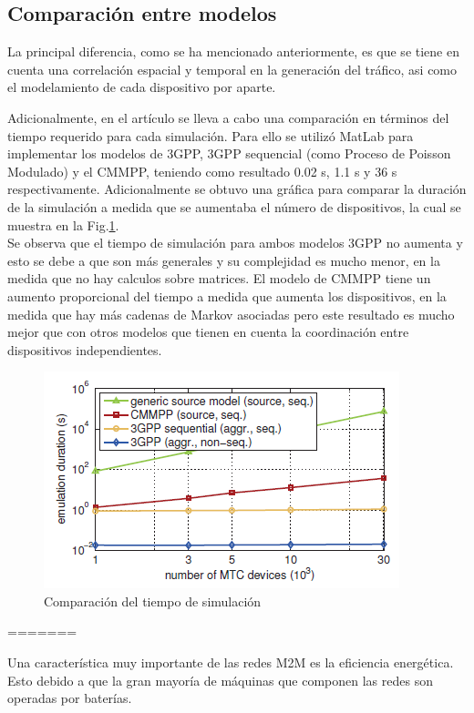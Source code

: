 \documentclass[journal]{IEEEtran}
\begin{document}
\subsection{Comparaci\'on entre modelos}
La principal diferencia, como se ha mencionado anteriormente, es que se tiene en cuenta una correlaci\'on espacial y temporal en la generaci\'on del tr\'afico, asi como el modelamiento de cada dispositivo por aparte.

Adicionalmente, en el art\'iculo se lleva a cabo una comparaci\'on en t\'erminos del tiempo requerido para cada simulaci\'on. Para ello se utiliz\'o MatLab para implementar los modelos de 3GPP, 3GPP sequencial (como Proceso de Poisson Modulado) y el CMMPP, teniendo como resultado 0.02 s, 1.1 s y 36 s respectivamente. Adicionalmente se obtuvo una gr\'afica para comparar la duraci\'on de la simulaci\'on a medida que se aumentaba el n\'umero de dispositivos, la cual se muestra en la Fig.\ref{comp}.\\

Se observa que el tiempo de simulaci\'on para ambos modelos 3GPP no aumenta y esto se debe a que son m\'as generales y su complejidad es mucho menor, en la medida que no hay calculos sobre matrices. El modelo de CMMPP tiene un aumento proporcional del tiempo a medida que aumenta los dispositivos, en la medida que hay m\'as cadenas de Markov asociadas pero este resultado es mucho mejor que con otros modelos que tienen en cuenta la coordinaci\'on entre dispositivos independientes.

\begin{figure}[H]
\centering
\includegraphics[scale=0.85]{graf5}
\caption{Comparaci\'on del tiempo de simulaci\'on}
\label{comp}
\end{figure}
=======

Una característica muy importante de las redes M2M es la eficiencia energética. Esto debido a que la gran mayoría de máquinas que componen las redes son operadas por baterías.
\end{document}
